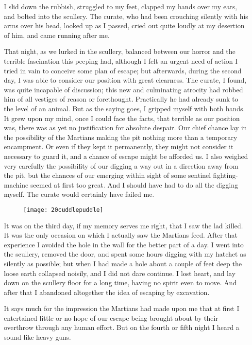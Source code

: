 I slid down the rubbish, struggled to my feet, clapped my hands over my ears, and bolted into the scullery. The curate, who had been crouching silently with his arms over his head, looked up as I passed, cried out quite loudly at my desertion of him, and came running after me.

That night, as we lurked in the scullery, balanced between our horror and the terrible fascination this peeping had, although I felt an urgent need of action I tried in vain to conceive some plan of escape; but afterwards, during the second day, I was able to consider our position with great clearness. The curate, I found, was quite incapable of discussion; this new and culminating atrocity had robbed him of all vestiges of reason or forethought. Practically he had already sunk to the level of an animal. But as the saying goes, I gripped myself with both hands. It grew upon my mind, once I could face the facts, that terrible as our position was, there was as yet no justification for absolute despair. Our chief chance lay in the possibility of the Martians making the pit nothing more than a temporary encampment. Or even if they kept it permanently, they might not consider it necessary to guard it, and a chance of escape might be afforded us. I also weighed very carefully the possibility of our digging a way out in a direction away from the pit, but the chances of our emerging within sight of some sentinel fighting-machine seemed at first too great. And I should have had to do all the digging myself. The curate would certainly have failed me.

\begin{figure}[tb]
\centering
\texttt{[image: 20cuddlepuddle]}
\end{figure}

It was on the third day, if my memory serves me right, that I saw the lad killed. It was the only occasion on which I actually saw the Martians feed. After that experience I avoided the hole in the wall for the better part of a day. I went into the scullery, removed the door, and spent some hours digging with my hatchet as silently as possible; but when I had made a hole about a couple of feet deep the loose earth collapsed noisily, and I did not dare continue. I lost heart, and lay down on the scullery floor for a long time, having no spirit even to move. And after that I abandoned altogether the idea of escaping by excavation.

It says much for the impression the Martians had made upon me that at first I entertained little or no hope of our escape being brought about by their overthrow through any human effort. But on the fourth or fifth night I heard a sound like heavy guns.

